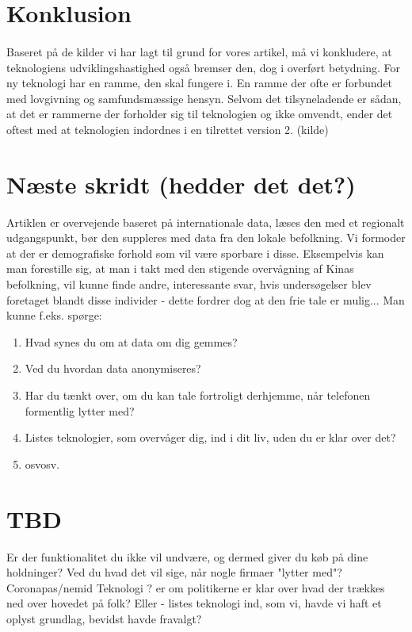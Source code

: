 \documentclass{article}
\begin{document}
\section{Konklusion}
\paragraph{}
Baseret på de kilder vi har lagt til grund for vores artikel, må vi konkludere, at teknologiens udviklingshastighed også bremser den, dog i overført betydning. For ny teknologi har en ramme, den skal fungere i. En ramme der ofte er forbundet med lovgivning og samfundsmæssige hensyn. Selvom det tilsyneladende er sådan, at det er rammerne der forholder sig til teknologien og ikke omvendt, ender det oftest med at teknologien indordnes i en tilrettet version 2. (kilde)

\section{Næste skridt (hedder det det?)}
Artiklen er overvejende baseret på internationale data, læses den med et regionalt udgangspunkt, bør den suppleres med data fra den lokale befolkning. Vi formoder at der er demografiske forhold som vil være sporbare i disse. Eksempelvis kan man forestille sig, at man i takt med den stigende overvågning af Kinas befolkning, vil kunne finde andre, interessante svar, hvis undersøgelser blev foretaget blandt disse individer - dette fordrer dog at den frie tale er mulig... 
Man kunne f.eks. spørge:
\begin{enumerate}
    \item Hvad synes du om at data om dig gemmes?
    \item Ved du hvordan data anonymiseres?
    \item Har du tænkt over, om du kan tale fortroligt derhjemme, når telefonen formentlig lytter med?
    \item Listes teknologier, som overvåger dig, ind i dit liv, uden du er klar over det?
    \item osvosv.    
\end{enumerate}
\newpage
\section{TBD}
Er der funktionalitet du ikke vil undvære, og dermed giver du køb på dine holdninger?
Ved du hvad det vil sige, når nogle firmaer "lytter med"?
Coronapas/nemid
Teknologi
? er om politikerne er klar over hvad der trækkes ned over hovedet på folk?
Eller - listes teknologi ind, som vi, havde vi haft et oplyst grundlag, bevidst havde fravalgt?
\end{document}
